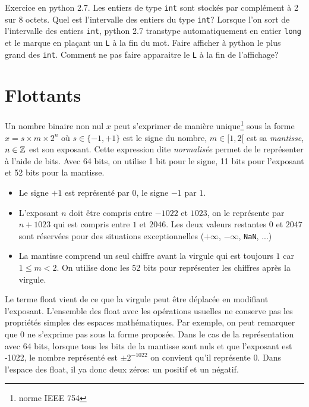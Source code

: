 Exercice en python 2.7.\newline
Les entiers de type \texttt{int} sont stockés par complément à 2 sur 8 octets. Quel est l'intervalle des entiers du type \texttt{int}?\newline
Lorsque l'on sort de l'intervalle des entiers \texttt{int}, python 2.7 transtype automatiquement en entier \texttt{long} et le marque en plaçant un \texttt{L} à la fin du mot. Faire afficher à python le plus grand des \texttt{int}. Comment ne pas faire apparaitre le \texttt{L} à la fin de l'affichage?   

\section{Flottants}
Un nombre binaire non nul $x$ peut s'exprimer de manière unique\footnote{norme IEEE 754} sous la forme $x = s\times m\times 2^n$ où $s\in\{-1,+1\}$ est le signe du nombre, $m\in [1,2[$ est sa \emph{mantisse}, $n\in \mathbb{Z}$ est son exposant.\newline
Cette expression dite \emph{normalisée} permet de le représenter à l'aide de bits.\newline
Avec 64 bits, on utilise 1 bit pour le signe, 11 bits pour l'exposant et 52 bits pour la mantisse.
\begin{itemize}
 \item Le signe $+1$ est représenté par $0$, le signe $-1$ par $1$.
 \item L'exposant $n$ doit être compris entre $-1022$ et $1023$, on le représente par $n + 1023$ qui est compris entre $1$ et $2046$. Les deux valeurs restantes $0$ et $2047$ sont réservées pour des situations exceptionnelles ($+\infty$, $-\infty$, \verb|NaN|, ...)
 \item La mantisse comprend un seul chiffre avant la virgule qui est toujours $1$ car $1\leq m <2$. On utilise donc les 52 bits pour représenter les chiffres après la virgule. 
\end{itemize}
Le terme float vient de ce que la virgule peut être déplacée en modifiant l'exposant.\newline
L'ensemble des float avec les opérations usuelles ne conserve pas les propriétés simples des espaces mathématiques.\newline
Par exemple, on peut remarquer que $0$ ne s'exprime pas sous la forme proposée. Dans le cas de la représentation avec 64 bits, lorsque tous les bits de la mantisse sont nuls et que l'exposant est -1022, le nombre représenté est $\pm 2^{-1022}$ on convient qu'il représente $0$. Dans l'espace des float, il ya donc deux zéros: un positif et un négatif.\newline
